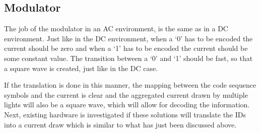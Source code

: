 

\subsection{Modulator}	

The job of the modulator in an AC environment, is the same as in a DC environment.
Just like in the DC environment, when a `0' has to be encoded the current should be zero and when a `1' has to be encoded the current should be some constant value.
The transition between a `0' and `1' should be fast, so that a square wave is created, just like in the DC case.

If the translation is done in this manner, the mapping between the code sequence symbols and the current is clear and the aggregated current drawn by multiple lights will also be a square wave, which will allow for decoding the information.
Next, existing hardware is investigated if these solutions will translate the IDs into a current draw which is similar to what has just been discussed above. 








